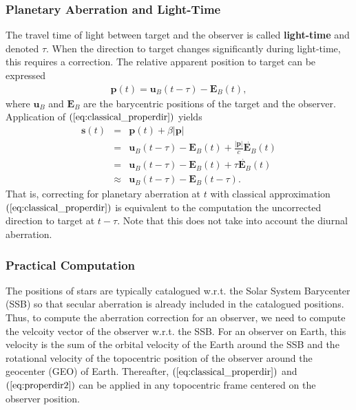 \documentclass [12pt, a4paper] {article}
\newcommand{\vc}[1]
{
	\boldsymbol{#1}
}
\begin{document}
\subsubsection{Planetary Aberration and Light-Time}
The travel time of light between target and the observer is called 
\textbf{light-time} and denoted $\tau$. When the direction to target 
changes significantly during light-time, this requires a correction. 
The relative apparent position to target can be expressed 
\begin {eqnarray}
    \vc p(t) = \vc u_B(t - \tau) - \vc E_B(t),
\end {eqnarray}
where $\vc u_B$ and $\vc E_B$ are the barycentric positions of the 
target and the observer. Application of $(\ref{eq:classical_properdir})$ 
yields 
\begin {eqnarray}
    \vc s(t) &=& \vc p(t) + \beta|\vc p|
    \\
    &=& 
    \vc u_B(t - \tau) - \vc E_B(t) + \frac{|\vc p|}{c}\dot{\vc E_B}(t)
    \\
    &=& 
    \vc u_B(t - \tau) - \vc E_B(t) + \tau\dot{\vc E_B}(t)
    \\
    &\approx& 
    \vc u_B(t - \tau) - \vc E_B(t - \tau).
\end {eqnarray}
That is, correcting for planetary aberration at $t$ with classical approximation 
$(\ref{eq:classical_properdir})$ is equivalent to the computation the uncorrected 
direction to target at $t-\tau$. Note that this does not take into account 
the diurnal aberration.

\subsubsection{Practical Computation}
The positions of stars are typically catalogued w.r.t. the Solar System 
Barycenter (SSB) so that secular aberration is already included in the 
catalogued positions. Thus, to compute the aberration correction for an 
observer, we need to compute the velcoity vector of the observer w.r.t. 
the SSB. For an observer on Earth, this velocity is the sum of the 
orbital velocity of the Earth around the SSB and the rotational velocity 
of the topocentric position of the observer around the geocenter (GEO) of 
Earth. Thereafter, $(\ref{eq:classical_properdir})$ and 
$(\ref{eq:properdir2})$ can be applied in any topocentric frame centered 
on the observer position.
\end{document}
